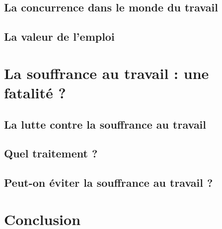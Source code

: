 \documentclass{report}
\begin{document}
	\section{La concurrence dans le monde du travail}

	\section{La valeur de l'emploi}

\chapter{La souffrance au travail : une fatalité ?}
	\section{La lutte contre la souffrance au travail}

	\section{Quel traitement ?}

	\section{Peut-on éviter la souffrance au travail ?}
    
\chapter*{Conclusion}
    \paragraph*{}
         
\end{document}
